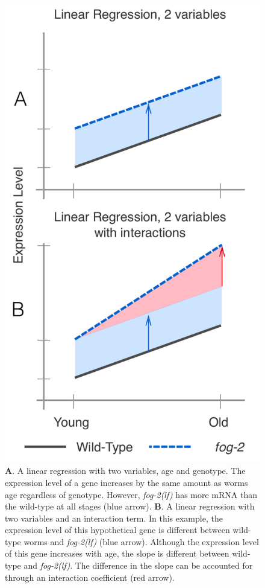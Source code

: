 \documentclass[9pt,twocolumn,twoside]{gsajnl}
\newcommand{\fog}{\emph{\mbox{fog-2(lf)}}}
\begin{document}
\begin{figure}[htbp]
\renewcommand{\familydefault}{\sfdefault}\normalfont{}
\centering
\includegraphics[width=\linewidth]{../../output/figs/final_figs/linear_regression.pdf}
\caption{
\textbf{A}. A linear regression with two variables, age and genotype.
The expression level of a gene increases by the same amount as worms age
regardless of genotype. However, \fog{} has more mRNA than the wild-type at all
stages (blue arrow).
\textbf{B}. A linear regression with two variables and an
interaction term. In this example, the expression level of this hypothetical
gene is different between wild-type worms and \fog{} (blue arrow). Although the
expression level of this gene increases with age, the slope is different between
wild-type and \fog{}. The difference in the slope can be accounted for through
an interaction coefficient (red arrow).
}
\label{fig:linear_reg}
\end{figure}
\end{document}
